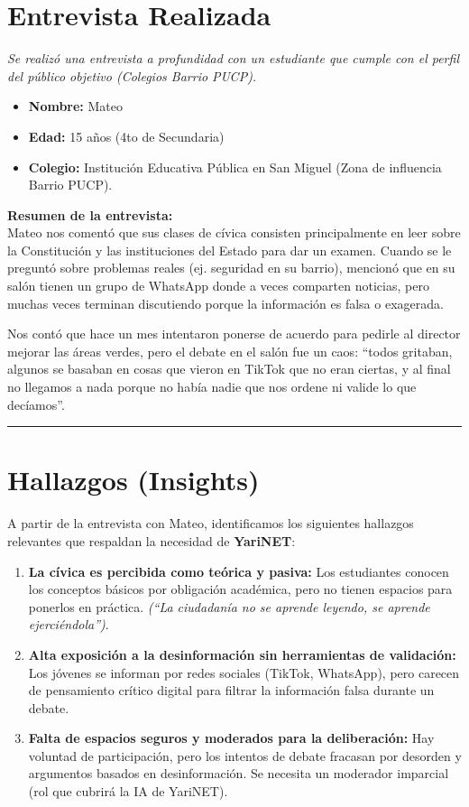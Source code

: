 \documentclass[12pt,a4paper]{article}
\begin{document}
\section{Entrevista Realizada}

\textit{Se realizó una entrevista a profundidad con un estudiante que cumple con el perfil del público objetivo (Colegios Barrio PUCP).}

\begin{itemize}
    \item \textbf{Nombre:} Mateo
    \item \textbf{Edad:} 15 años (4to de Secundaria)
    \item \textbf{Colegio:} Institución Educativa Pública en San Miguel (Zona de influencia Barrio PUCP).
\end{itemize}

\textbf{Resumen de la entrevista:}\\
Mateo nos comentó que sus clases de cívica consisten principalmente en leer sobre la Constitución y las instituciones del Estado para dar un examen. Cuando se le preguntó sobre problemas reales (ej. seguridad en su barrio), mencionó que en su salón tienen un grupo de WhatsApp donde a veces comparten noticias, pero muchas veces terminan discutiendo porque la información es falsa o exagerada. 

Nos contó que hace un mes intentaron ponerse de acuerdo para pedirle al director mejorar las áreas verdes, pero el debate en el salón fue un caos: ``todos gritaban, algunos se basaban en cosas que vieron en TikTok que no eran ciertas, y al final no llegamos a nada porque no había nadie que nos ordene ni valide lo que decíamos''.

\vspace{0.5cm}
\hrule
\vspace{0.5cm}

\section{Hallazgos (Insights)}

A partir de la entrevista con Mateo, identificamos los siguientes hallazgos relevantes que respaldan la necesidad de \textbf{YariNET}:

\begin{enumerate}
    \item \textbf{La cívica es percibida como teórica y pasiva:} Los estudiantes conocen los conceptos básicos por obligación académica, pero no tienen espacios para ponerlos en práctica. \textit{(``La ciudadanía no se aprende leyendo, se aprende ejerciéndola'')}.
    \item \textbf{Alta exposición a la desinformación sin herramientas de validación:} Los jóvenes se informan por redes sociales (TikTok, WhatsApp), pero carecen de pensamiento crítico digital para filtrar la información falsa durante un debate.
    \item \textbf{Falta de espacios seguros y moderados para la deliberación:} Hay voluntad de participación, pero los intentos de debate fracasan por desorden y argumentos basados en desinformación. Se necesita un moderador imparcial (rol que cubrirá la IA de YariNET).
\end{enumerate}
\end{document}
